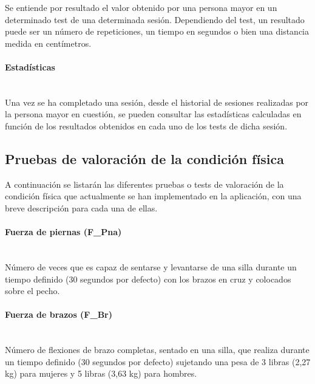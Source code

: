 Se entiende por resultado el valor obtenido por una persona mayor en un determinado test de una determinada sesión. Dependiendo del test, un resultado puede ser un número de repeticiones, un tiempo en segundos o bien una distancia medida en centímetros.

\paragraph{Estadísticas}\mbox{}\\

Una vez se ha completado una sesión, desde el historial de sesiones realizadas por la persona mayor en cuestión, se pueden consultar las estadísticas calculadas en función de los resultados obtenidos en cada uno de los tests de dicha sesión.

\subsection{Pruebas de valoración de la condición física}

A continuación se listarán las diferentes pruebas o tests de valoración de la condición física que actualmente se han implementado en la aplicación, con una breve descripción para cada una de ellas.

\paragraph{Fuerza de piernas (F\_Pna)}\mbox{}\\

Número de veces que es capaz de sentarse y levantarse de una silla durante un tiempo definido (30 segundos por defecto) con los brazos en cruz y colocados sobre el pecho.


\paragraph{Fuerza de brazos (F\_Br)}\mbox{}\\

Número de flexiones de brazo completas, sentado en una silla, que realiza durante un tiempo definido (30 segundos por defecto) sujetando una pesa de 3 libras (2,27 kg) para mujeres y 5 libras (3,63 kg) para hombres.


